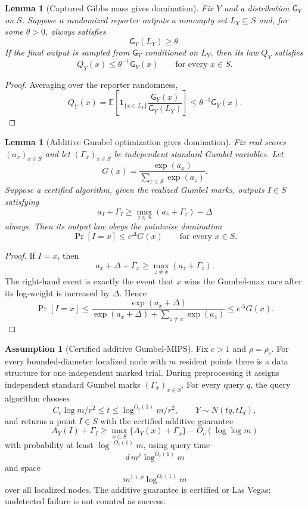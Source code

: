 \documentclass[10pt]{article}
\newtheorem{lemma}[theorem]{Lemma}
\theoremstyle{definition}
\newtheorem{assumption}[theorem]{Assumption}
\newcommand{\E}{\mathbb{E}}
\begin{document}
\begin{lemma}[Captured Gibbs mass gives domination]\label{lem:captured-gibbs-domination}
   Fix $Y$ and a distribution $\mathsf G_Y$ on $S$. Suppose a randomized
   reporter outputs a nonempty set $L_Y\subseteq S$ and, for some
   $\theta>0$, always satisfies
   \[
      \mathsf G_Y(L_Y)\ge\theta.
   \]
   If the final output is sampled from $\mathsf G_Y$ conditioned on $L_Y$,
   then its law $Q_Y$ satisfies
   \[
      Q_Y(x)\le \theta^{-1}\mathsf G_Y(x)
      \qquad\text{for every }x\in S.
   \]
\end{lemma}

\begin{proof}
   Averaging over the reporter randomness,
   \[
      Q_Y(x)
      =
      \E\left[
         \mathbf 1_{\{x\in L_Y\}}
         \frac{\mathsf G_Y(x)}{\mathsf G_Y(L_Y)}
      \right]
      \le
      \theta^{-1}\mathsf G_Y(x).
   \]
\end{proof}

\begin{lemma}[Additive Gumbel optimization gives domination]\label{lem:gumbel-additive-domination}
   Fix real scores $(a_x)_{x\in S}$ and let $(\Gamma_x)_{x\in S}$ be
   independent standard Gumbel variables. Let
   \[
      G(x)=\frac{\exp(a_x)}{\sum_{z\in S}\exp(a_z)}.
   \]
   Suppose a certified algorithm, given the realized Gumbel marks, outputs
   $I\in S$ satisfying
   \[
      a_I+\Gamma_I\ge
      \max_{z\in S}(a_z+\Gamma_z)-\Delta
   \]
   always. Then its output law obeys the pointwise domination
   \[
      \Pr[I=x]\le e^\Delta G(x)
      \qquad\text{for every }x\in S.
   \]
\end{lemma}

\begin{proof}
   If $I=x$, then
   \[
      a_x+\Delta+\Gamma_x
      \ge
      \max_{z\ne x}(a_z+\Gamma_z).
   \]
   The right-hand event is exactly the event that $x$ wins the Gumbel-max race
   after its log-weight is increased by $\Delta$. Hence
   \[
      \Pr[I=x]
      \le
      \frac{\exp(a_x+\Delta)}
           {\exp(a_x+\Delta)+\sum_{z\ne x}\exp(a_z)}
      \le
      e^\Delta G(x).
   \]
\end{proof}

\begin{assumption}[Certified additive Gumbel-MIPS]\label{asm:gumbel-mips}
   Fix $c>1$ and $\rho=\rho_c$. For every bounded-diameter localized node with
   $m$ resident points there is a data structure for one independent marked
   trial. During preprocessing it assigns independent standard Gumbel marks
   $(\Gamma_x)_{x\in S}$. For every query $q$, the query algorithm chooses
   \[
      C_c\log m/r^2\le t\le \log^{O_c(1)}m/r^2,
      \qquad
      Y\sim N(tq,tI_d),
   \]
   and returns a point $I\in S$ with the certified additive guarantee
   \[
      A_Y(I)+\Gamma_I
      \ge
      \max_{x\in S}\{A_Y(x)+\Gamma_x\}
      -O_c(\log\log m)
   \]
   with probability at least $\log^{-O_c(1)}m$, using query time
   \[
      d\,m^\rho\log^{O_c(1)}m
   \]
   and space
   \[
      m^{1+\rho}\log^{O_c(1)}m
   \]
   over all localized nodes. The additive guarantee is certified or Las Vegas:
   undetected failure is not counted as success.
\end{assumption}
\end{document}
